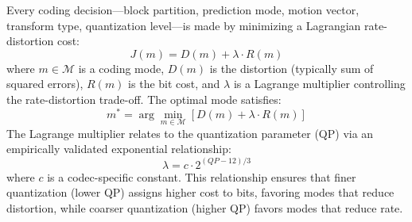 Every coding decision---block partition, prediction mode, motion vector,
transform type, quantization level---is made by minimizing a Lagrangian
rate-distortion cost:
\begin{equation}
  J(m) = D(m) + \lambda \cdot R(m)
  \label{eq:rd-cost}
\end{equation}
where $m \in \mathcal{M}$ is a coding mode, $D(m)$ is the distortion
(typically sum of squared errors), $R(m)$ is the bit cost, and $\lambda$ is a
Lagrange multiplier controlling the rate-distortion trade-off. The optimal
mode satisfies:
\begin{equation}
  m^* = \arg\min_{m \in \mathcal{M}} \left[ D(m) + \lambda \cdot R(m) \right]
  \label{eq:rd-opt}
\end{equation}
The Lagrange multiplier relates to the quantization parameter (QP) via an
empirically validated exponential relationship:
\begin{equation}
  \lambda = c \cdot 2^{(QP - 12)/3}
  \label{eq:lambda-qp}
\end{equation}
where $c$ is a codec-specific constant. This relationship ensures that
finer quantization (lower QP) assigns higher cost to bits, favoring modes
that reduce distortion, while coarser quantization (higher QP) favors
modes that reduce rate.

